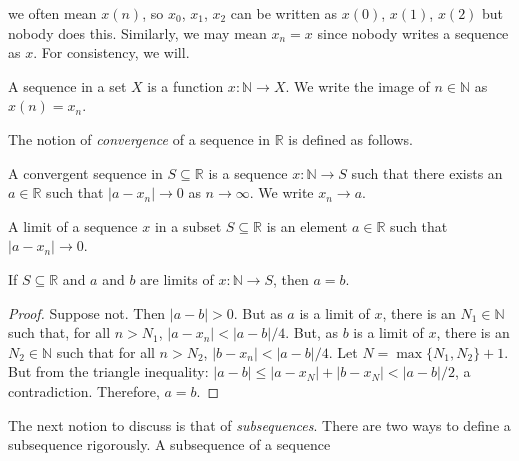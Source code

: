 \documentclass[crop=false,class=book,oneside]{standalone}
\begin{document}
            we often mean $x(n)$, so $x_{0}$, $x_{1}$,
            $x_{2}$ can be written as $x(0)$, $x(1)$,
            $x(2)$ but nobody does this. Similarly,
            we may mean $x_{n}=x$ since nobody writes
            a sequence as $x$. For consistency, we will.
            \begin{definition}
                A sequence in a set $X$ is a function
                $x:\mathbb{N}\rightarrow{X}$.
                We write the image of $n\in\mathbb{N}$
                as $x(n)=x_{n}$.
            \end{definition}
            The notion of \textit{convergence} of a sequence
            in $\mathbb{R}$ is defined as follows.
            \begin{definition}
                A convergent sequence in $S\subseteq\mathbb{R}$
                is a sequence $x:\mathbb{N}\rightarrow{S}$
                such that there exists an $a\in\mathbb{R}$
                such that $|a-x_{n}|\rightarrow{0}$ as
                $n\rightarrow\infty$. We write
                $x_{n}\rightarrow{a}$.
            \end{definition}
            \begin{definition}
                A limit of a sequence $x$
                in a subset $S\subseteq\mathbb{R}$ is an
                element $a\in\mathbb{R}$ such that
                $|a-x_{n}|\rightarrow{0}$.
            \end{definition}
            \begin{theorem}
                If $S\subseteq\mathbb{R}$ and $a$ and $b$ are
                limits of $x:\mathbb{N}\rightarrow{S}$,
                then $a=b$.
            \end{theorem}
            \begin{proof}
                Suppose not. Then $|a-b|>0$. But as $a$ is a
                limit of $x$, there is an $N_{1}\in\mathbb{N}$
                such that, for all $n>N_{1}$,
                $|a-x_{n}|<|a-b|/4$. But, as $b$ is a limit
                of $x$, there is an $N_{2}\in\mathbb{N}$
                such that for all $n>N_{2}$,
                $|b-x_{n}|<|a-b|/4$. Let $N=\max\{N_{1},N_{2}\}+1$.
                But from the triangle inequality:
                $|a-b|\leq|a-x_{N}|+|b-x_{N}|<|a-b|/2$, a
                contradiction. Therefore, $a=b$.
            \end{proof}
            The next notion to discuss is that of
            \textit{subsequences}. There are two ways to define
            a subsequence rigorously. A subsequence of a sequence
\end{document}
